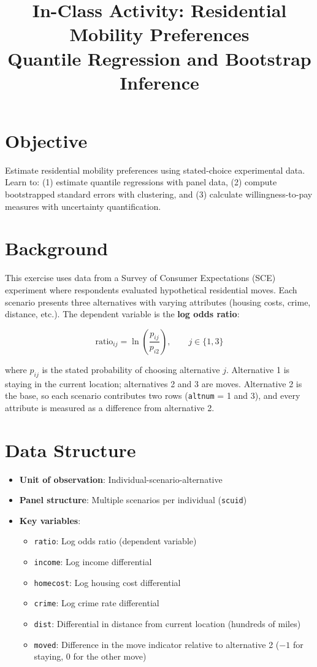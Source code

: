 \documentclass[12pt]{article}
\title{In-Class Activity: Residential Mobility Preferences\\\large{Quantile Regression and Bootstrap Inference}}
\author{}
\date{}
\begin{document}
\maketitle

\section{Objective}

Estimate residential mobility preferences using stated-choice experimental data. Learn to: (1) estimate quantile regressions with panel data, (2) compute bootstrapped standard errors with clustering, and (3) calculate willingness-to-pay measures with uncertainty quantification.

\section{Background}

This exercise uses data from a Survey of Consumer Expectations (SCE) experiment where respondents evaluated hypothetical residential moves. Each scenario presents three alternatives with varying attributes (housing costs, crime, distance, etc.). The dependent variable is the \textbf{log odds ratio}:

$$\text{ratio}_{ij} = \ln\left(\frac{p_{ij}}{p_{i2}}\right), \qquad j \in \{1, 3\}$$

where $p_{ij}$ is the stated probability of choosing alternative $j$. Alternative 1 is staying in the current location; alternatives 2 and 3 are moves. Alternative 2 is the base, so each scenario contributes two rows (\texttt{altnum} = 1 and 3), and every attribute is measured as a difference from alternative 2.

\section{Data Structure}

\begin{itemize}
    \item \textbf{Unit of observation}: Individual-scenario-alternative
    \item \textbf{Panel structure}: Multiple scenarios per individual (\texttt{scuid})
    \item \textbf{Key variables}:
    \begin{itemize}
        \item \texttt{ratio}: Log odds ratio (dependent variable)
        \item \texttt{income}: Log income differential
        \item \texttt{homecost}: Log housing cost differential
        \item \texttt{crime}: Log crime rate differential
        \item \texttt{dist}: Differential in distance from current location (hundreds of miles)
        \item \texttt{moved}: Difference in the move indicator relative to alternative 2 ($-1$ for staying, 0 for the other move)
    \end{itemize}
\end{itemize}
\end{document}
